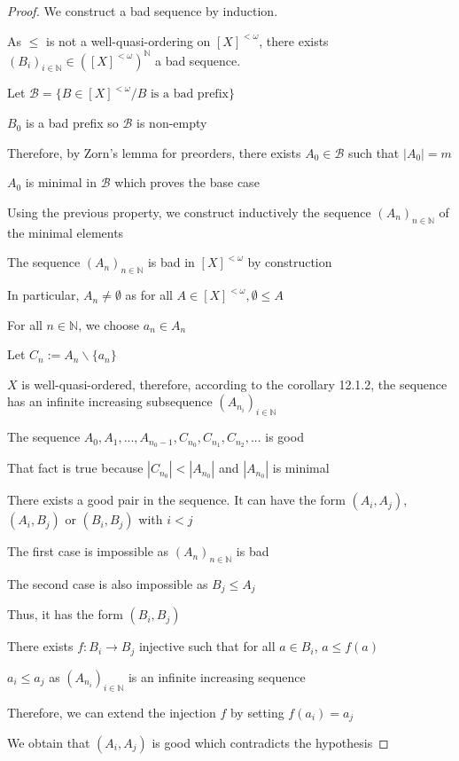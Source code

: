 \begin{proof}
  We construct a bad sequence by induction.

  As \(\leq\) is not a well-quasi-ordering on \([X]^{<\omega}\), there exists \(\left(B_i\right)_{i\in\mathbb{N}}\in([X]^{<\omega})^\mathbb{N}\) a bad sequence.

  Let \(\mathcal{B}=\{B\in[X]^{<\omega}/B\text{ is a bad prefix}\}\) 

  \(B_0\) is a bad prefix so \(\mathcal{B}\) is non-empty

  Therefore, by Zorn's lemma for preorders, there exists \(A_0\in\mathcal{B}\) such that \(|A_0|=m\)

  \(A_0\) is minimal in \(\mathcal{B}\) which proves the base case

  Using the previous property, we construct inductively the sequence \(\left(A_n\right)_{n\in\mathbb{N}}\) of the minimal elements

  The sequence \(\left(A_n\right)_{n\in\mathbb{N}}\) is bad in \([X]^{<\omega}\) by construction
  
  In particular, \(A_n\neq\emptyset\) as for all \(A\in[X]^{<\omega}, \emptyset\leq A\)

  For all \(n\in\mathbb{N}\), we choose \(a_n\in A_n\)

  Let \(C_n:=A_n\backslash\{a_n\}\)

  \(X\) is well-quasi-ordered, therefore, according to the corollary 12.1.2, the sequence has an infinite increasing subsequence \(\left(A_{n_i}\right)_{i\in\mathbb{N}}\)

  The sequence \(A_0,A_1,...,A_{n_0-1},C_{n_0},C_{n_1},C_{n_2},...\) is good

  That fact is true because \(|C_{n_0}|<|A_{n_0}|\) and \(|A_{n_0}|\) is minimal

  There exists a good pair in the sequence. It can have the form \((A_i,A_j)\), \((A_i,B_j)\) or \((B_i,B_j)\) with \(i<j\)

  The first case is impossible as \(\left(A_n\right)_{n\in\mathbb{N}}\) is bad

  The second case is also impossible as \(B_j\leq A_j\)

  Thus, it has the form \((B_i,B_j)\)

  There exists \(f:B_i\to B_j\) injective such that for all \(a\in B_i\), \(a\leq f(a)\)

  \(a_i\leq a_j\) as \(\left(A_{n_i}\right)_{i\in\mathbb{N}}\) is an infinite increasing sequence

  Therefore, we can extend the injection \(f\) by setting \(f(a_i)=a_j\)

  We obtain that \((A_i,A_j)\) is good which contradicts the hypothesis
\end{proof}

